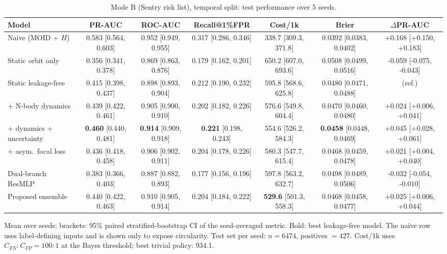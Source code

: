 \begin{table}[t]
\centering
\small
\caption{Mode B (Sentry risk list), temporal split: test performance over 5 seeds.}
\label{tab:sentry_temporal_all}
\begin{tabular}{lcccccc}
\toprule
Model & PR-AUC & ROC-AUC & Recall@1\%FPR & Cost/1k & Brier & $\Delta$PR-AUC \\
\midrule
Naive (MOID + $H$) & 0.583 \scriptsize{[0.564, 0.603]} & 0.952 \scriptsize{[0.949, 0.955]} & 0.317 \scriptsize{[0.286, 0.346]} & 338.7 \scriptsize{[309.3, 371.8]} & 0.0392 \scriptsize{[0.0383, 0.0402]} & +0.168 \scriptsize{[+0.150, +0.183]} \\
\midrule
Static orbit only & 0.356 \scriptsize{[0.341, 0.378]} & 0.869 \scriptsize{[0.863, 0.876]} & 0.179 \scriptsize{[0.162, 0.201]} & 650.2 \scriptsize{[607.0, 693.6]} & 0.0508 \scriptsize{[0.0499, 0.0516]} & -0.059 \scriptsize{[-0.075, -0.043]} \\
Static leakage-free & 0.415 \scriptsize{[0.398, 0.437]} & 0.898 \scriptsize{[0.893, 0.904]} & 0.212 \scriptsize{[0.190, 0.232]} & 595.8 \scriptsize{[568.6, 625.8]} & 0.0480 \scriptsize{[0.0471, 0.0488]} & (ref.) \\
+ N-body dynamics & 0.439 \scriptsize{[0.422, 0.461]} & 0.905 \scriptsize{[0.900, 0.910]} & 0.202 \scriptsize{[0.182, 0.226]} & 576.6 \scriptsize{[549.8, 604.4]} & 0.0470 \scriptsize{[0.0460, 0.0480]} & +0.024 \scriptsize{[+0.006, +0.041]} \\
+ dynamics + uncertainty & \textbf{0.460} \scriptsize{[0.440, 0.481]} & \textbf{0.914} \scriptsize{[0.909, 0.918]} & \textbf{0.221} \scriptsize{[0.198, 0.243]} & 554.6 \scriptsize{[526.2, 584.3]} & \textbf{0.0458} \scriptsize{[0.0448, 0.0469]} & +0.045 \scriptsize{[+0.028, +0.061]} \\
+ asym.\ focal loss & 0.436 \scriptsize{[0.418, 0.458]} & 0.906 \scriptsize{[0.902, 0.911]} & 0.204 \scriptsize{[0.178, 0.226]} & 580.3 \scriptsize{[547.7, 615.4]} & 0.0468 \scriptsize{[0.0459, 0.0478]} & +0.021 \scriptsize{[+0.004, +0.040]} \\
Dual-branch ResMLP & 0.383 \scriptsize{[0.366, 0.403]} & 0.887 \scriptsize{[0.882, 0.893]} & 0.177 \scriptsize{[0.156, 0.196]} & 597.8 \scriptsize{[563.2, 632.7]} & 0.0498 \scriptsize{[0.0489, 0.0506]} & -0.032 \scriptsize{[-0.054, -0.010]} \\
Proposed ensemble & 0.440 \scriptsize{[0.422, 0.463]} & 0.910 \scriptsize{[0.905, 0.914]} & 0.204 \scriptsize{[0.184, 0.222]} & \textbf{529.6} \scriptsize{[501.3, 558.3]} & 0.0468 \scriptsize{[0.0458, 0.0477]} & +0.025 \scriptsize{[+0.006, +0.044]} \\
\bottomrule
\end{tabular}
\par\vspace{2pt}\footnotesize Mean over seeds; brackets: 95\% paired stratified-bootstrap CI of the seed-averaged metric. Bold: best leakage-free model. The naive row uses label-defining inputs and is shown only to expose circularity. Test set per seed: $n=6474$, positives $=427$. Cost/1k uses $C_{FN}{:}C_{FP}=100{:}1$ at the Bayes threshold; best trivial policy: 934.1.
\end{table}
